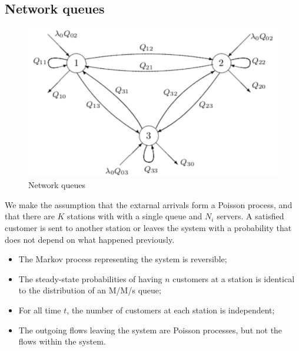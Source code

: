 \documentclass[12pt, openany]{report}
\theoremstyle{definition}
\begin{document}
\subsection{Network queues}
\begin{figure}[H]
	\centering 
	\includegraphics[width=.7\textwidth]{img/network_queue.png}
	\caption{Network queues}
	\label{fig:network_queues}
\end{figure}
We make the assumption that the extarnal arrivals form a Poisson process, and that there are $K$ stations with with a single queue and $N_i$ servers. A satisfied customer is sent to another station or leaves the system with a probability that does not depend on what happened previously. 
\begin{itemize}
	\item The Markov process representing the system is reversible;
	\item The steady-state probabilities of having $n$ customers at a station is identical to the distribution of an M/M/s queue;
	\item For all time $t$, the number of customers at each station is independent;
	\item The outgoing flows leaving the system are Poisson processes, but not the flows within the system. 
\end{itemize}
\end{document}
